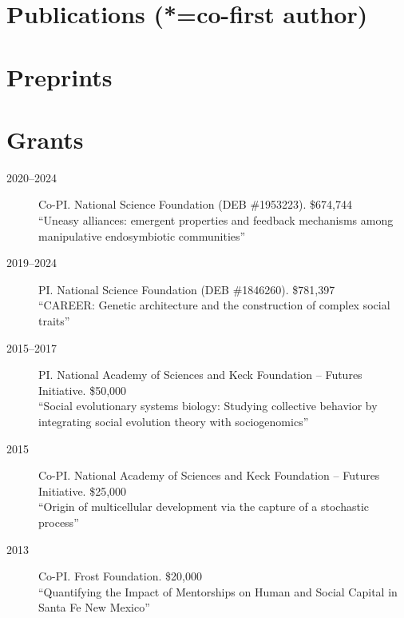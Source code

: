 \documentclass[11pt]{article}
\begin{document}
  \section{Publications {\small (*=co-first author)}}
  
  \begin{publist}
    
    
    
  \end{publist}
  
  \section{Preprints}
  
  \begin{publist}

  \item {}
    
  \item {}
        
  \item {}
    
  \end{publist}
  
  \section{Grants}
  \begin{description}
  \item[2020--2024] Co-PI. National Science Foundation (DEB \#1953223). \$674,744\\
    ``Uneasy alliances: emergent properties and feedback mechanisms among manipulative endosymbiotic communities''
  \item[2019--2024] PI. National Science Foundation (DEB \#1846260). \$781,397\\
    ``CAREER: Genetic architecture and the construction of complex social traits''
  \item[2015--2017] PI. National Academy of Sciences and Keck Foundation -- Futures Initiative. \$50,000\\
    ``Social evolutionary systems biology: Studying collective behavior by integrating social evolution theory with sociogenomics''
  \item[2015] Co-PI. National Academy of Sciences and Keck Foundation -- Futures Initiative. \$25,000\\
    ``Origin of multicellular development via the capture of a stochastic process''
  \item[2013] Co-PI. Frost Foundation. \$20,000 \\
    ``Quantifying the Impact of Mentorships on Human and Social Capital in Santa Fe New Mexico''
  \end{description}
  
\end{document}
